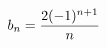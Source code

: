 \documentclass[preview]{standalone}
\begin{document}
\begin{align*}
\special{dvisvgm:raw <g id='unique000'>}b_n=\dfrac{2(-1)^{n+1}}{n}\special{dvisvgm:raw </g>}
\end{align*}
\end{document}
